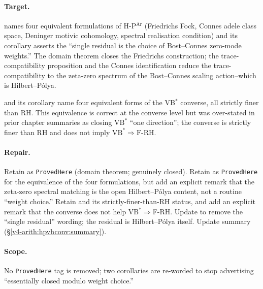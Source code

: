 \paragraph{Target.} 
names four equivalent formulations of H-P\(^{\mathrm{Ar}}\)
(Friedrichs Fock, Connes adele class space, Deninger motivic
cohomology, spectral realisation condition) and its corollary
 asserts the
``single residual is the choice of Bost--Connes zero-mode weights.''
The domain theorem 
closes the Friedrichs construction; the trace-compatibility
proposition 
and the Connes identification
 reduce the
trace-compatibility to the zeta-zero spectrum of the Bost--Connes
scaling action--which is Hilbert--P\'olya.

and its corollary
 name four
equivalent forms of the VB\(^{*}\) converse, all strictly finer than
RH. This equivalence is correct at the converse level but was
over-stated in prior chapter summaries as closing
\(\mathrm{VB}^{*}\) ``one direction''; the converse is strictly
finer than RH and does not imply
\(\mathrm{VB}^{*}\Rightarrow\mathrm{F}\text{-}\mathrm{RH}\).

\paragraph{Repair.} Retain
 as \texttt{ProvedHere}
(domain theorem; genuinely closed). Retain
 as
\texttt{ProvedHere} for the equivalence of the four formulations,
but add an explicit remark that the zeta-zero spectral matching is
the open Hilbert--P\'olya content, not a routine ``weight choice.''
Retain
and its strictly-finer-than-RH status, and add an explicit remark
that the converse does not help VB\(^{*}\Rightarrow\)F-RH.
Update  to remove
the ``single residual'' wording; the residual is Hilbert--P\'olya
itself. Update summary
(\S\ref{v4-arith:hpvbconv:summary}).

\paragraph{Scope.} No \texttt{ProvedHere} tag is removed; two
corollaries are re-worded to stop advertising ``essentially closed
modulo weight choice.''

